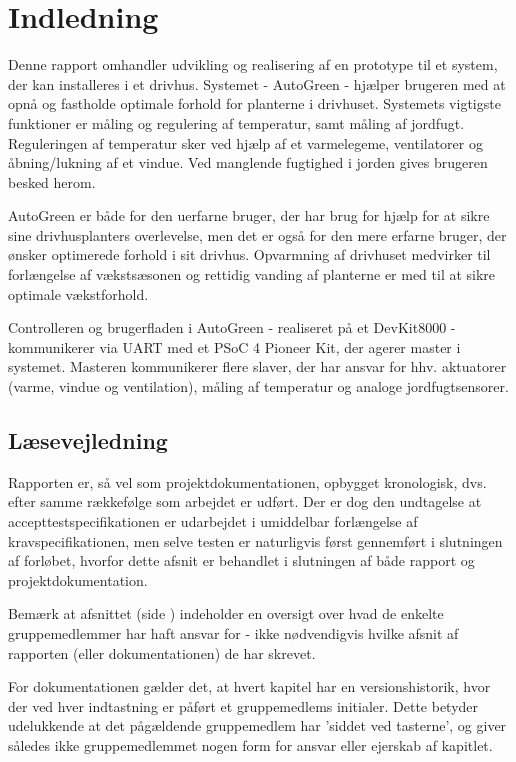 \chapter{Indledning}
\label{ch:Indledning}

Denne rapport omhandler udvikling og realisering af en prototype til et system, der kan installeres i et drivhus. 
Systemet - AutoGreen - hjælper brugeren med at opnå og fastholde optimale forhold for planterne i drivhuset.
Systemets vigtigste funktioner er måling og regulering af temperatur, samt måling af jordfugt.
Reguleringen af temperatur sker ved hjælp af et varmelegeme, ventilatorer og åbning/lukning af et vindue. 
Ved manglende fugtighed i jorden gives brugeren besked herom. 

AutoGreen er både for den uerfarne bruger, der har brug for hjælp for at sikre sine drivhusplanters overlevelse, men det er også for den mere erfarne bruger, der ønsker optimerede forhold i sit drivhus. 
Opvarmning af drivhuset medvirker til forlængelse af vækstsæsonen og rettidig vanding af planterne er med til at sikre optimale vækstforhold. 

Controlleren og brugerfladen i AutoGreen - realiseret på et DevKit8000 - kommunikerer via UART med et PSoC 4 Pioneer Kit, der agerer \IIC master i systemet. 
Masteren kommunikerer flere \IIC slaver, der har ansvar for hhv. aktuatorer (varme, vindue og ventilation), måling af temperatur og analoge jordfugtsensorer.

\section{Læsevejledning}
Rapporten er, så vel som projektdokumentationen, opbygget kronologisk, dvs. efter samme rækkefølge som arbejdet er udført. Der er dog den undtagelse at accepttestspecifikationen er udarbejdet i umiddelbar forlængelse af kravspecifikationen, men selve testen er naturligvis først gennemført i slutningen af forløbet, hvorfor dette afsnit er behandlet i slutningen af både rapport og projektdokumentation. 

Bemærk at afsnittet  (side \pageref{ch:arbejdsopgaver}) indeholder en oversigt over hvad de enkelte gruppemedlemmer har haft ansvar for - ikke nødvendigvis hvilke afsnit af rapporten (eller dokumentationen) de har skrevet. 

For dokumentationen gælder det, at hvert kapitel har en versionshistorik, hvor der ved hver indtastning er påført et gruppemedlems initialer. 
Dette betyder udelukkende at det pågældende gruppemedlem har 'siddet ved tasterne', og giver således ikke gruppemedlemmet nogen form for ansvar eller ejerskab af kapitlet. 

